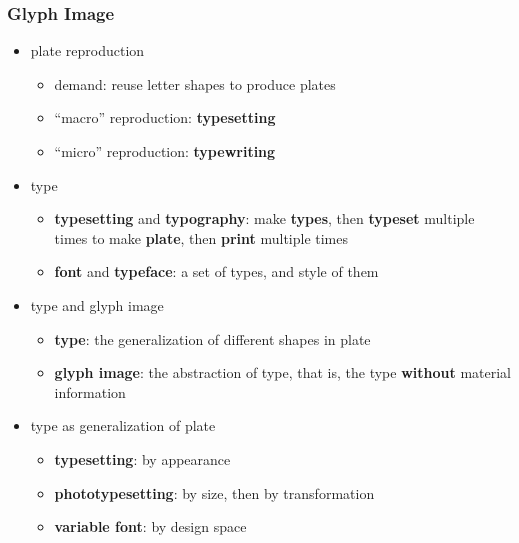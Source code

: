 \documentclass{beamer}
\begin{document}
	\begin{frame}
		\frametitle{Glyph Image}
		
		\begin{itemize}
			\item plate reproduction
			\begin{itemize}
                \item demand: reuse letter shapes to produce plates
                \item ``macro'' reproduction: \textbf{typesetting}
                \item \color{gray} ``micro'' reproduction: \textbf{typewriting}
            \end{itemize}
            \item type
			\begin{itemize}
				\item \textbf{typesetting} and \textbf{typography}: make \textbf{types}, then \textbf{typeset} multiple times to make \textbf{plate}, then \textbf{print} multiple times
				\item \textbf{font} and \textbf{typeface}: a set of types, and style of them
            \end{itemize}
            \item type and glyph image
			\begin{itemize}
				\item \textbf{type}: the generalization of different shapes in plate
				\item \textbf{glyph image}: the abstraction of type, that is, the type \textbf{without} material information
			\end{itemize}
			\item type as generalization of plate
			\begin{itemize}
				\item \textbf{typesetting}: by appearance
				\item \textbf{phototypesetting}: by size, then by transformation
				\item \textbf{variable font}: by design space
            \end{itemize}
		\end{itemize}
	\end{frame}
	
\end{document}
